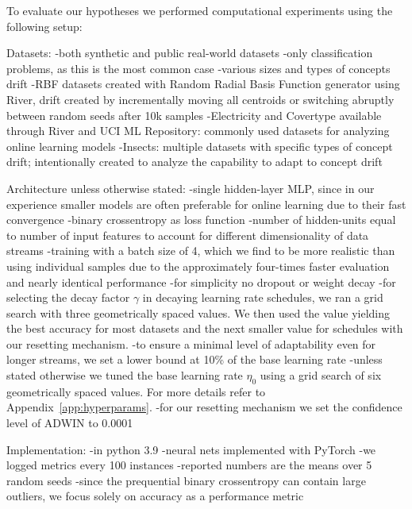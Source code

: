 \documentclass[letterpaper]{article} %
\begin{document}
To evaluate our hypotheses we performed computational experiments using the following setup:

Datasets:
-both synthetic and public real-world datasets
-only classification problems, as this is the most common case
-various sizes and types of concepts drift
-RBF datasets created with Random Radial Basis Function generator using River, drift created by incrementally moving all centroids or switching abruptly between random seeds after 10k samples
-Electricity and Covertype available through River and UCI ML Repository: commonly used datasets for analyzing online learning models
-Insects: multiple datasets with specific types of concept drift; intentionally created to analyze the capability to adapt to concept drift


Architecture unless otherwise stated:
-single hidden-layer MLP, since in our experience smaller models are often preferable for online learning due to their fast convergence
-binary crossentropy as loss function
-number of hidden-units equal to number of input features to account for different dimensionality of data streams
-training with a batch size of 4, which we find to be more realistic than using individual samples due to the approximately four-times faster evaluation and nearly identical performance
-for simplicity no dropout or weight decay
-for selecting the decay factor $\gamma$ in decaying learning rate schedules, we ran a grid search with three geometrically spaced values. We then used the value yielding the best accuracy for most datasets and the next smaller value for schedules with our resetting mechanism.
-to ensure a minimal level of adaptability even for longer streams, we set a lower bound at 10\% of the base learning rate
-unless stated otherwise we tuned the base learning rate $\eta_0$ using a grid search of six geometrically spaced values. For more details refer to Appendix~\ref{app:hyperparams}.
-for our resetting mechanism we set the confidence level of ADWIN to 0.0001

Implementation:
-in python 3.9
-neural nets implemented with PyTorch
-we logged metrics every 100 instances
-reported numbers are the means over 5 random seeds
-since the prequential binary crossentropy can contain large outliers, we focus solely on accuracy as a performance metric
\end{document}
